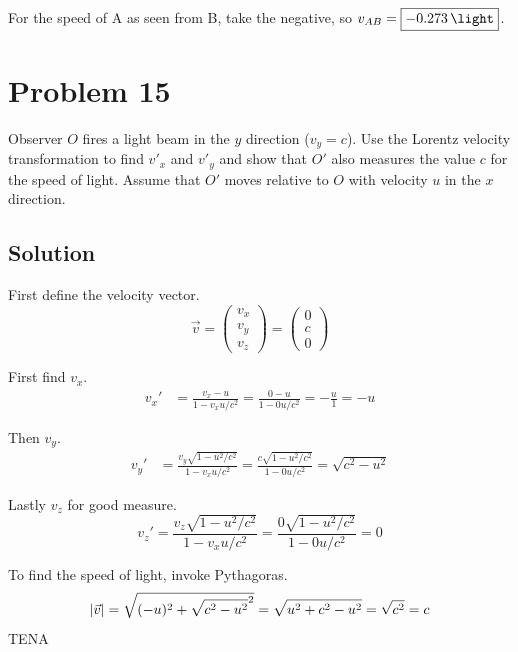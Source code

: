 \documentclass[12pt]{article}
\begin{document}
        For the speed of A as seen from B, take the negative, so $v_{AB} = \boxed{-0.273\,\unit{\light}}$.
    \pagebreak

\section{Problem 15} %
    Observer $O$ ﬁres a light beam in the $y$ direction ($v_y = c$).
    Use the Lorentz velocity transformation to ﬁnd $v'_x$ and $v'_y$ and show that $O'$ also measures the value $c$ for the speed of light. 
    Assume that $O'$ moves relative to $O$ with velocity $u$ in the $x$ direction.

    \subsection{Solution}
        First define the velocity vector. \begin{equation}
            \vec{v} = \begin{pmatrix} v_x \\ v_y \\ v_z \end{pmatrix} = \begin{pmatrix} 0 \\ c \\ 0 \end{pmatrix}
        \end{equation}

        First find $v_x$.
        \begin{align}
            v_x'    &=  \frac{v_x - u}{1 - v_x u/c^2}
                =   \frac{0 - u}{1 - 0 u/c^2}
                =   -\frac{u}{1}
                =   -u
        \end{align}

        Then $v_y$.
        \begin{align}
            v_y'    &=  \frac{v_y \sqrt{1 - u^2/c^2}}{1 - v_x u/c^2}
                =   \frac{c \sqrt{1 - u^2/c^2}}{1 - 0 u/c^2}
                =   \sqrt{c^2 - u^2}
        \end{align}

        Lastly $v_z$ for good measure.
        \begin{equation}
            v_z'    =   \frac{v_z \sqrt{1 - u^2/c^2}}{1 - v_x u/c^2}
                =   \frac{0 \sqrt{1 - u^2/c^2}}{1 - 0 u/c^2}
                =   0
        \end{equation}

        To find the speed of light, invoke Pythagoras.
        \begin{equation}
            \left| \vec{v} \right|  =   \sqrt{(-u)^2 + \sqrt{c^2 - u^2}^2}\\
                =   \sqrt{u^2 + c^2 - u^2}
                =   \sqrt{c^2}
                =   c
        \end{equation}
        TENA
    \pagebreak
\end{document}
